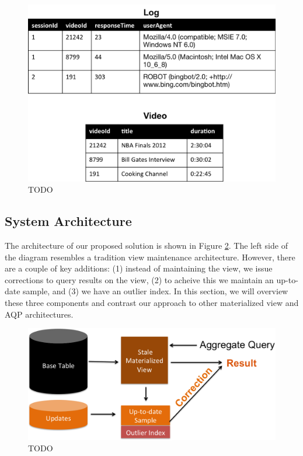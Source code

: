 \begin{figure}[h]
\label{example}
\centering
 \includegraphics[width=\columnwidth]{figs/sample-clean-example.png}
 \caption{TODO}
\end{figure}

\subsection{System Architecture}
The architecture of our proposed solution is shown in Figure \ref{sys-arch}.
The left side of the diagram resembles a tradition view maintenance architecture.
However, there are a couple of key additions: (1) instead of maintaining the view,
we issue corrections to query results on the view, (2) to acheive this we maintain
an up-to-date sample, and (3) we have an outlier index.
In this section, we will overview these three components and contrast our approach 
to other materialized view and AQP architectures.

\begin{figure}[h]
\label{sys-arch}
\centering
 \includegraphics[width=\columnwidth]{figs/sys-arch.png}
 \caption{TODO}
\end{figure}

